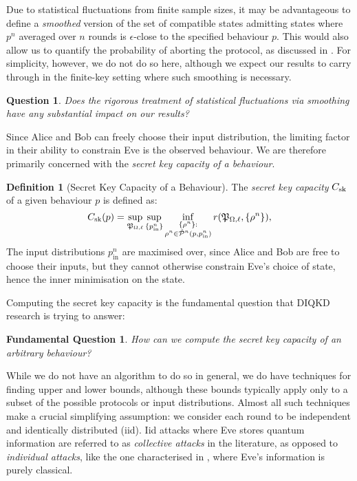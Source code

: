 \documentclass[10pt, a4paper]{article}
\numberwithin{equation}{section} %
\newcounter{stmt} %
\theoremstyle{definition}
\newtheorem{defn}[stmt]{Definition}
\theoremstyle{plain}
\newtheorem{question}{Question}
\newtheorem{funqn}{Fundamental Question}
\newcommand{\?}{\mathrel{?}} %
\newcommand{\compatstates}[3][]{\hat{\mathcal{P}}#1(#2,#3)}
\newcommand{\proto}[2][_{\Omega,\ell}]{\mathfrak{#2}#1}
\newcommand{\prin}[1][p]{#1_{\mathrm{in}}}
\newcommand{\sk}{\rm sk}
\begin{document}
    Due to statistical fluctuations from finite sample sizes, it may be advantageous to define a \emph{smoothed} version of the set of compatible states admitting states where \(p^n\) averaged over \(n\) rounds is \(\epsilon\)-close to the specified behaviour \(p\). This would also allow us to quantify the probability of aborting the protocol, as discussed in . For simplicity, however, we do not do so here, although we expect our results to carry through in the finite-key setting where such smoothing is necessary.
    \begin{question}
      Does the rigorous treatment of statistical fluctuations via smoothing have any substantial impact on our results?
    \end{question}

    Since Alice and Bob can freely choose their input distribution, the limiting factor in their ability to constrain Eve is the observed behaviour. We are therefore primarily concerned with the \emph{secret key capacity of a behaviour}.
    \begin{defn}[Secret Key Capacity of a Behaviour]\label{def:seckeycapbehav}
    The \emph{secret key capacity} \(C_{\sk}\) of a given behaviour \(p\) is defined as:
    \begin{equation}
    C_{\sk}(p) = \sup_{\proto{P}} \sup_{\{\prin^n\}} \inf_{\substack{\{\rho^{n}\} : \\ \rho^{n} \in \compatstates[^n]{p}{\prin^n}}} r(\proto{P}, \{\rho^{n}\}),
    \end{equation}
     The input distributions \(\prin^n\) are maximised over, since Alice and Bob are free to choose their inputs, but they cannot otherwise constrain Eve's choice of state, hence the inner minimisation on the state.
    \end{defn}

    Computing the secret key capacity is the fundamental question that DIQKD research is trying to answer:
    \begin{funqn}\label{fqn:cap}
      How can we compute the secret key capacity of an arbitrary behaviour?
    \end{funqn}
    While we do not have an algorithm to do so in general, we do have techniques for finding upper and lower bounds, although these bounds typically apply only to a subset of the possible protocols or input distributions. Almost all such techniques make a crucial simplifying assumption: we consider each round to be independent and identically distributed (iid). Iid attacks where Eve stores quantum information are referred to as \emph{collective attacks} in the literature, as opposed to \emph{individual attacks}, like the one characterised in , where Eve's information is purely classical.
\end{document}
